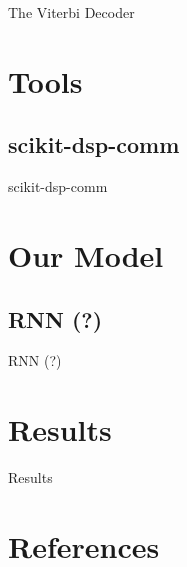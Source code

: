 \documentclass{beamer}
\newcommand{\<}				{\langle}
\renewcommand{\>}      		{\rangle}
\begin{document}
\begin{frame}{The Viterbi Decoder}


\end{frame}

\section{Tools} 

\subsection{scikit-dsp-comm} 

\begin{frame}{scikit-dsp-comm}


\end{frame}

\section{Our Model} 

\subsection{RNN (?)} 

\begin{frame}{RNN (?)}


\end{frame}

\section{Results} 

\begin{frame}{Results}


\end{frame}

\section{References}
\end{document}

